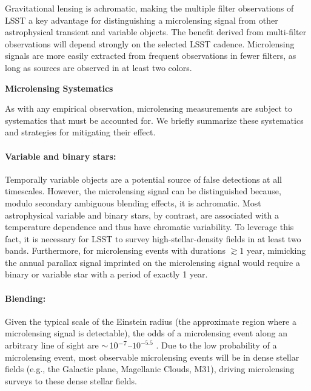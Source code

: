 

Gravitational lensing is achromatic, making the multiple filter observations of LSST a key advantage for distinguishing a microlensing signal from other astrophysical transient and variable objects.
The benefit derived from multi-filter observations will depend strongly on the selected LSST cadence. 
Microlensing signals are more easily extracted from frequent observations in fewer filters, as long as sources are observed in at least two colors. 


\noindent \textbf{Microlensing Systematics}

As with any empirical observation, microlensing measurements are subject to systematics that must be accounted for.
We briefly summarize these systematics and strategies for mitigating their effect.

\paragraph{Variable and binary stars:} Temporally variable objects are a potential source of false detections at all timescales. However, the microlensing signal can be distinguished because, modulo secondary ambiguous blending effects, it is achromatic. Most astrophysical variable and binary stars, by contrast, are associated with a temperature dependence and thus have chromatic variability. To leverage this fact, it is necessary for LSST to survey high-stellar-density fields in at least two bands. Furthermore, for microlensing events with durations $\gtrsim 1$ year, mimicking the annual parallax signal imprinted on the microlensing signal would require a binary or variable star with a period of exactly 1 year.

\paragraph{Blending:} Given the typical scale  of the Einstein radius (the approximate region where a microlensing signal is detectable), the odds of a microlensing event along an arbitrary line of sight are $ {\sim}\, 10^{-7}$--$10^{-5.5}$ \citep[\eg][]{2000ApJ...541..734A,2006ApJ...636..240S}.
Due to the low probability of a microlensing event, most observable microlensing events will be in dense stellar fields (e.g., the Galactic plane, Magellanic Clouds, M31), driving microlensing surveys to these dense stellar fields.

